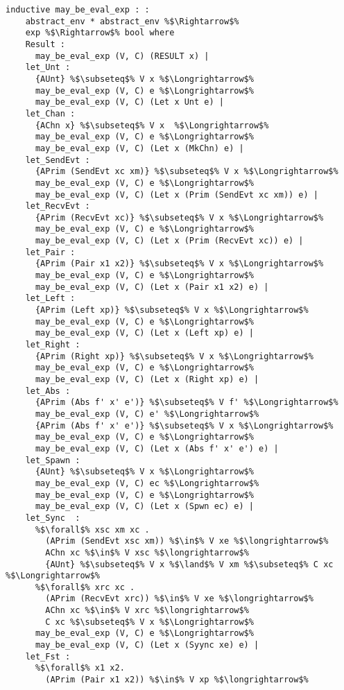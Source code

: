 \documentclass{article}
\begin{document}
\begin{lstlisting}[style=codestyle1, escapechar=\%]
  inductive may_be_eval_exp : :
    abstract_env * abstract_env %$\Rightarrow$%
    exp %$\Rightarrow$% bool where
    Result :
      may_be_eval_exp (V, C) (RESULT x) |
    let_Unt :
      {AUnt} %$\subseteq$% V x %$\Longrightarrow$%
      may_be_eval_exp (V, C) e %$\Longrightarrow$% 
      may_be_eval_exp (V, C) (Let x Unt e) |
    let_Chan : 
      {AChn x} %$\subseteq$% V x  %$\Longrightarrow$%
      may_be_eval_exp (V, C) e %$\Longrightarrow$%
      may_be_eval_exp (V, C) (Let x (MkChn) e) |
    let_SendEvt : 
      {APrim (SendEvt xc xm)} %$\subseteq$% V x %$\Longrightarrow$%
      may_be_eval_exp (V, C) e %$\Longrightarrow$% 
      may_be_eval_exp (V, C) (Let x (Prim (SendEvt xc xm)) e) |
    let_RecvEvt :
      {APrim (RecvEvt xc)} %$\subseteq$% V x %$\Longrightarrow$%
      may_be_eval_exp (V, C) e %$\Longrightarrow$% 
      may_be_eval_exp (V, C) (Let x (Prim (RecvEvt xc)) e) |
    let_Pair : 
      {APrim (Pair x1 x2)} %$\subseteq$% V x %$\Longrightarrow$%
      may_be_eval_exp (V, C) e %$\Longrightarrow$% 
      may_be_eval_exp (V, C) (Let x (Pair x1 x2) e) |
    let_Left : 
      {APrim (Left xp)} %$\subseteq$% V x %$\Longrightarrow$%
      may_be_eval_exp (V, C) e %$\Longrightarrow$% 
      may_be_eval_exp (V, C) (Let x (Left xp) e) |
    let_Right :
      {APrim (Right xp)} %$\subseteq$% V x %$\Longrightarrow$%
      may_be_eval_exp (V, C) e %$\Longrightarrow$% 
      may_be_eval_exp (V, C) (Let x (Right xp) e) |
    let_Abs : 
      {APrim (Abs f' x' e')} %$\subseteq$% V f' %$\Longrightarrow$%
      may_be_eval_exp (V, C) e' %$\Longrightarrow$%
      {APrim (Abs f' x' e')} %$\subseteq$% V x %$\Longrightarrow$%
      may_be_eval_exp (V, C) e %$\Longrightarrow$% 
      may_be_eval_exp (V, C) (Let x (Abs f' x' e') e) |
    let_Spawn :
      {AUnt} %$\subseteq$% V x %$\Longrightarrow$%
      may_be_eval_exp (V, C) ec %$\Longrightarrow$% 
      may_be_eval_exp (V, C) e %$\Longrightarrow$%  
      may_be_eval_exp (V, C) (Let x (Spwn ec) e) |
    let_Sync  : 
      %$\forall$% xsc xm xc . 
        (APrim (SendEvt xsc xm)) %$\in$% V xe %$\longrightarrow$% 
        AChn xc %$\in$% V xsc %$\longrightarrow$%
        {AUnt} %$\subseteq$% V x %$\land$% V xm %$\subseteq$% C xc %$\Longrightarrow$%
      %$\forall$% xrc xc . 
        (APrim (RecvEvt xrc)) %$\in$% V xe %$\longrightarrow$%
        AChn xc %$\in$% V xrc %$\longrightarrow$%
        C xc %$\subseteq$% V x %$\Longrightarrow$%
      may_be_eval_exp (V, C) e %$\Longrightarrow$%  
      may_be_eval_exp (V, C) (Let x (Syync xe) e) |
    let_Fst : 
      %$\forall$% x1 x2.
        (APrim (Pair x1 x2)) %$\in$% V xp %$\longrightarrow$%

\end{lstlisting}
\end{document}
